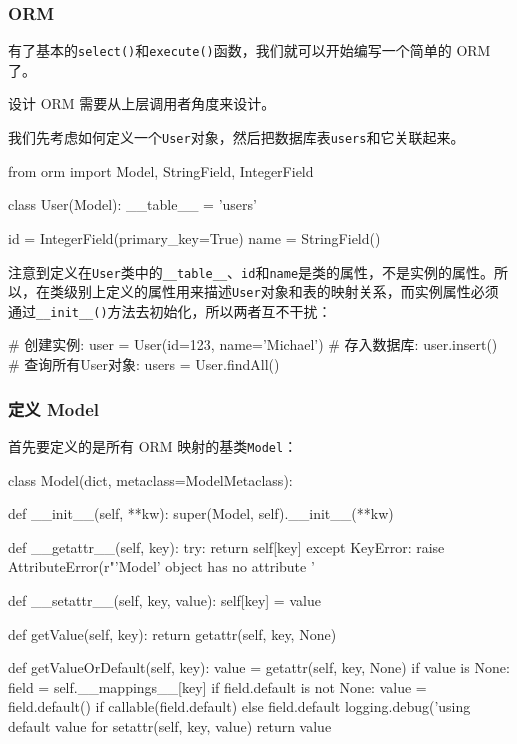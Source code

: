 \hypertarget{orm}{%
\subsubsection{ORM}\label{orm}}

有了基本的\texttt{select()}和\texttt{execute()}函数，我们就可以开始编写一个简单的
ORM 了。

设计 ORM 需要从上层调用者角度来设计。

我们先考虑如何定义一个\texttt{User}对象，然后把数据库表\texttt{users}和它关联起来。

\begin{pythoncode}
from orm import Model, StringField, IntegerField

class User(Model):
    __table__ = 'users'

    id = IntegerField(primary_key=True)
    name = StringField()
\end{pythoncode}

注意到定义在\texttt{User}类中的\texttt{\_\_table\_\_}、\texttt{id}和\texttt{name}是类的属性，不是实例的属性。所以，在类级别上定义的属性用来描述\texttt{User}对象和表的映射关系，而实例属性必须通过\texttt{\_\_init\_\_()}方法去初始化，所以两者互不干扰：

\begin{pythoncode}
# 创建实例:
user = User(id=123, name='Michael')
# 存入数据库:
user.insert()
# 查询所有User对象:
users = User.findAll()
\end{pythoncode}

\hypertarget{ux5b9aux4e49-model}{%
\subsubsection{定义 Model}\label{ux5b9aux4e49-model}}

首先要定义的是所有 ORM 映射的基类\texttt{Model}：

\begin{pythoncode}
class Model(dict, metaclass=ModelMetaclass):

    def __init__(self, **kw):
        super(Model, self).__init__(**kw)

    def __getattr__(self, key):
        try:
            return self[key]
        except KeyError:
            raise AttributeError(r"'Model' object has no attribute '%

    def __setattr__(self, key, value):
        self[key] = value

    def getValue(self, key):
        return getattr(self, key, None)

    def getValueOrDefault(self, key):
        value = getattr(self, key, None)
        if value is None:
            field = self.__mappings__[key]
            if field.default is not None:
                value = field.default() if callable(field.default) else field.default
                logging.debug('using default value for %
                setattr(self, key, value)
        return value
\end{pythoncode}

